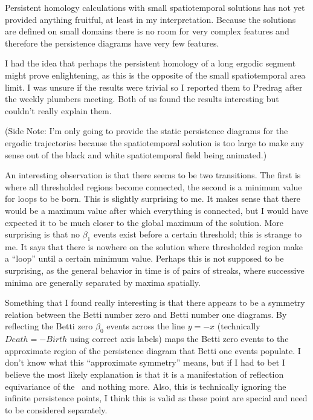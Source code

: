 \begin{description}
{\begin{description}
Persistent homology calculations with small spatiotemporal solutions
has not yet provided anything fruitful, at least in my interpretation. Because
the solutions are defined on small domains there is no room
for very complex features and therefore the persistence diagrams have very few features.

I had the idea that perhaps the persistent homology of a long ergodic
segment might prove enlightening, as this is the opposite of the small spatiotemporal
area limit. I was unsure if the results were trivial so I reported them to Predrag
after the weekly plumbers meeting. Both of us found the results interesting
but couldn't really explain them.

(Side Note: I'm only going to provide the static persistence
diagrams for the ergodic trajectories because the spatiotemporal solution is too large to make
any sense out of the black and white spatiotemporal field being animated.)

An interesting observation is that there
seems to be two transitions. The first is where all thresholded regions become connected, the
second is a minimum value for loops to be born. This is slightly surprising to me. It makes
sense that there would be a maximum value after which everything is connected, but I would have expected
it to be much closer to the global maximum of the solution. More surprising is that no $\beta_1$ events
exist before a certain threshold; this is strange to me. It says that there is nowhere on the solution where
thresholded region make a ``loop'' until a certain minimum value. Perhaps this is not supposed to be surprising, as
the general behavior in time is of pairs of streaks, where successive minima are generally separated by maxima spatially.

Something that I found really interesting is that there appears to be a symmetry relation between the
Betti number zero and Betti number one diagrams. By reflecting the Betti zero $\beta_0$
events across the line $y=-x$ (technically $Death = -Birth$ using correct axis labels) maps the Betti zero
events to the approximate region of the persistence diagram that Betti one events populate. I don't know what this ``approximate symmetry'' means,
but if I had to bet I believe the most likely explanation is that it is a manifestation of reflection equivariance
of the \KSe\ and nothing more. Also, this is technically ignoring the infinite persistence points, I think this is
valid as these point are special and need to be considered separately.


\end{description}}
\end{description}
